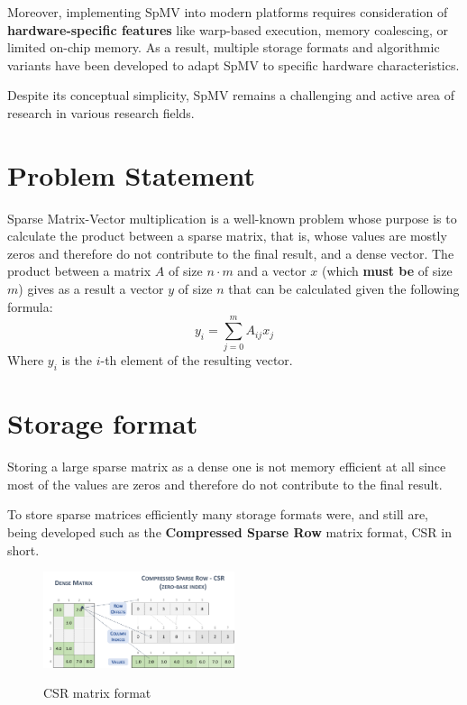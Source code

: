 \documentclass[conference]{IEEEtran}
\begin{document}
    Moreover, implementing SpMV into modern platforms requires consideration of
    \textbf{hardware-specific features} like warp-based execution, memory
    coalescing, or limited on-chip memory.
    As a result, multiple storage formats and algorithmic variants have been
    developed to adapt SpMV to specific hardware characteristics.

    Despite its conceptual simplicity, SpMV remains a challenging and active area
    of research in various research fields.
    
    \section{Problem Statement}

    Sparse Matrix-Vector multiplication is a well-known problem whose purpose
    is to calculate the product between a sparse matrix, that is, whose values
    are mostly zeros and therefore do not contribute to the final result, and a
    dense vector.
    The product between a matrix $A$ of size $n \cdot m$ and a vector $x$
    (which \textbf{must be} of size $m$) gives as a result a vector $y$ of size
    $n$ that can be calculated given the following formula:
    $$
    y_i = \sum\limits_{j = 0}^{m} A_{ij} x_j
    $$
    Where $y_i$ is the $i$-th element of the resulting vector.

    \section{Storage format}

    Storing a large sparse matrix as a dense one is not memory efficient at all
    since most of the values are zeros and therefore do not contribute to the
    final result.

    To store sparse matrices efficiently many storage formats were, and still
    are, being developed such as the \textbf{Compressed Sparse Row} matrix
    format, CSR in short.

    \begin{figure}[ht]
        \caption{CSR matrix format}
        \centering
        \includegraphics[width=0.5\textwidth]{csr-format.png}
        \label{fig:csr-format}
    \end{figure}
\end{document}
